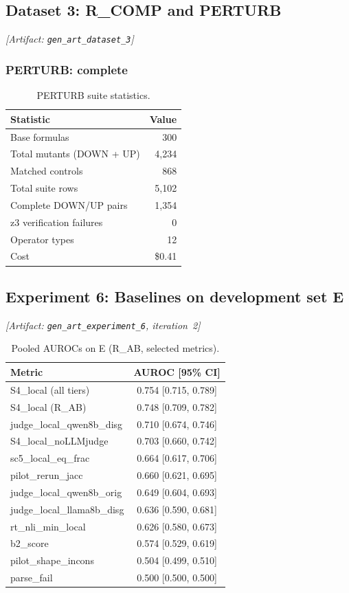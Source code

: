 \documentclass[11pt,letterpaper]{article}
\begin{document}
\subsection{Dataset 3: R\_COMP and PERTURB}
\label{sec:ds3}
\noindent\textit{[Artifact: \texttt{gen\_art\_dataset\_3}]}

\subsubsection{PERTURB: complete}

\begin{table}[!htbp]
\centering
\caption{PERTURB suite statistics.}
\label{tab:perturb_stats}
\begin{tabular}{lr}
\toprule
Statistic & Value \\
\midrule
Base formulas & 300 \\
Total mutants (DOWN + UP) & 4,234 \\
Matched controls & 868 \\
Total suite rows & 5,102 \\
Complete DOWN/UP pairs & 1,354 \\
z3 verification failures & 0 \\
Operator types & 12 \\
Cost & \$0.41 \\
\bottomrule
\end{tabular}
\end{table}

\subsection{Experiment 6: Baselines on development set E}
\label{sec:exp6_iter2}
\noindent\textit{[Artifact: \texttt{gen\_art\_experiment\_6}, iteration~2]}

\begin{table}[!htbp]
\centering
\caption{Pooled AUROCs on E (R\_AB, selected metrics).}
\label{tab:baselines_e}
\begin{tabular}{lc}
\toprule
Metric & AUROC [95\% CI] \\
\midrule
S4\_local (all tiers) & 0.754 [0.715, 0.789] \\
S4\_local (R\_AB) & 0.748 [0.709, 0.782] \\
judge\_local\_qwen8b\_disg & 0.710 [0.674, 0.746] \\
S4\_local\_noLLMjudge & 0.703 [0.660, 0.742] \\
sc5\_local\_eq\_frac & 0.664 [0.617, 0.706] \\
pilot\_rerun\_jacc & 0.660 [0.621, 0.695] \\
judge\_local\_qwen8b\_orig & 0.649 [0.604, 0.693] \\
judge\_local\_llama8b\_disg & 0.636 [0.590, 0.681] \\
rt\_nli\_min\_local & 0.626 [0.580, 0.673] \\
b2\_score & 0.574 [0.529, 0.619] \\
pilot\_shape\_incons & 0.504 [0.499, 0.510] \\
parse\_fail & 0.500 [0.500, 0.500] \\
\bottomrule
\end{tabular}
\end{table}
\end{document}

